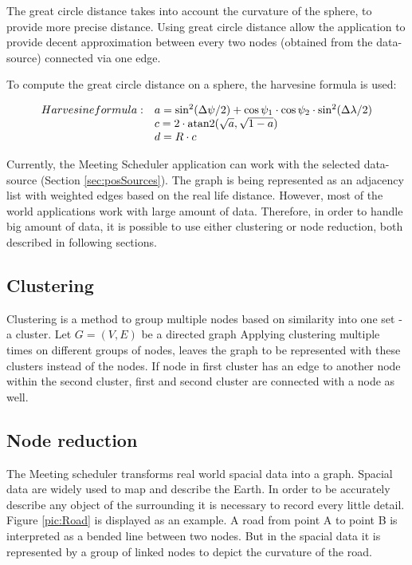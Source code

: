 \documentclass[thesis=M,english]{FITthesis}[2012/10/20]
\DeclareMathOperator{\atantwo}{atan2}
\begin{document}
The great circle distance takes into account the curvature of the sphere, to provide more precise distance. Using great circle distance allow the application to provide decent approximation between every two nodes (obtained from the data-source) connected via one edge.

To compute the great circle distance on a sphere, the harvesine formula is used: 

$$
\begin{array}{l l}
Harvesine formula: & a = \sin^2(\Delta \psi /2) + \cos \psi_1 \cdot \cos \psi_2 \cdot \sin^2(\Delta \lambda /2) \\
& c = 2 \cdot \atantwo ( \sqrt{a}, \sqrt{1 - a} ) \\
& d = R \cdot c
\end{array}
$$ 

Currently, the Meeting Scheduler application can work with the selected data-source (Section \ref{sec:posSources}). The graph is being represented as an adjacency list with weighted edges based on the real life distance. However, most of the world applications work with large amount of data. Therefore, in order to handle big amount of data, it is possible to use either clustering or node reduction, both described in following sections.

\subsection{Clustering}
Clustering is a method to group multiple nodes based on similarity into one set - a cluster. 
Let $G = (V, E)$ be a directed graph
Applying clustering multiple times on different groups of nodes, leaves the graph to be represented with these clusters instead of the nodes. If node in first cluster has an edge to another node within the second cluster, first and second cluster are connected with a node as well. 





\subsection{Node reduction}
The Meeting scheduler transforms real world spacial data into a graph. Spacial data are widely used to map and describe the Earth. In order to be accurately describe any object of the surrounding it is necessary to record every little detail. Figure \ref{pic:Road} is displayed as an example. A road from point A to point B is interpreted as a bended line between two nodes. But in the spacial data it is represented by a group of linked nodes to depict the curvature of the road.
\end{document}
